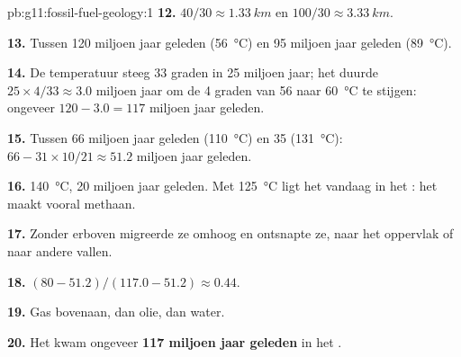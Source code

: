 \begin{solution}{pb:g11:fossil-fuel-geology:1}
\textbf{12.} $40/30 \approx \qty{1.33}{km}$ en $100/30 \approx
\qty{3.33}{km}$.

\textbf{13.} Tussen 120 miljoen jaar geleden (\qty{56}{\degreeCelsius}) en
95 miljoen jaar geleden (\qty{89}{\degreeCelsius}).

\textbf{14.} De temperatuur steeg 33 graden in 25 miljoen jaar; het duurde
$25 \times 4/33 \approx 3.0$ miljoen jaar om de 4 graden van
\num{56} naar \qty{60}{\degreeCelsius} te stijgen: ongeveer $120 - 3.0 = 117$ miljoen jaar
geleden.

\textbf{15.} Tussen 66 miljoen jaar geleden (\qty{110}{\degreeCelsius}) en
35 (\qty{131}{\degreeCelsius}): $66 - 31 \times 10/21 \approx 51.2$ miljoen
jaar geleden.

\textbf{16.} \qty{140}{\degreeCelsius}, 20 miljoen jaar geleden. Met
\qty{125}{\degreeCelsius} ligt het vandaag in het : het maakt vooral
methaan.

\textbf{17.} Zonder  erboven migreerde ze omhoog en ontsnapte ze, naar het
oppervlak of naar andere vallen.

\textbf{18.} $(80 - 51.2)/(117.0 - 51.2) \approx 0.44$.

\textbf{19.} Gas bovenaan, dan olie, dan water.

\textbf{20.} Het  kwam ongeveer \textbf{117
miljoen jaar geleden} in het .
\end{solution}
